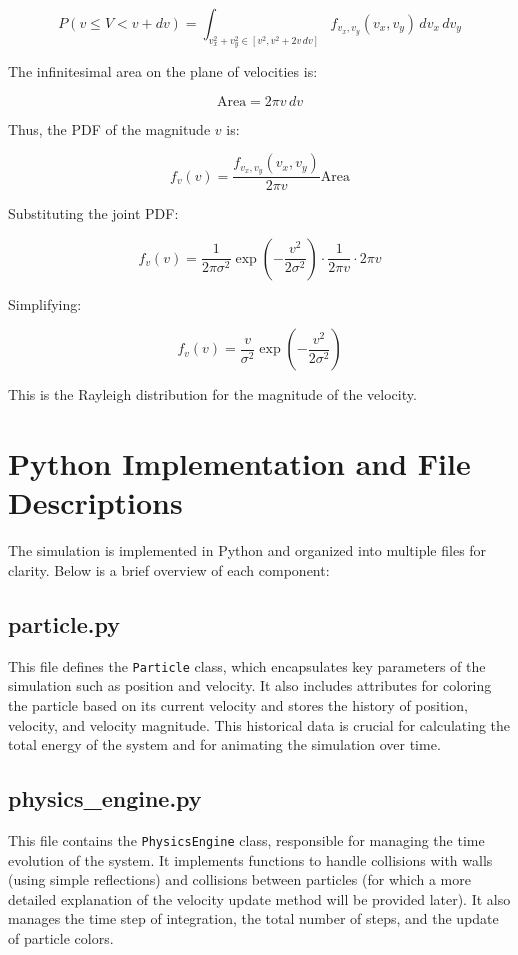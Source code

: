 \documentclass{article}
\begin{document}
\[
P(v \leq V < v + dv) = \int_{v_x^2 + v_y^2 \in [v^2, v^2 + 2v \, dv]} f_{v_x, v_y}(v_x, v_y) \, dv_x \, dv_y
\]

The infinitesimal area on the plane of velocities is:

\[
\text{Area} = 2 \pi v \, dv
\]

Thus, the PDF of the magnitude \( v \) is:

\[
f_v(v) = \frac{f_{v_x, v_y}(v_x, v_y)}{2 \pi v} \text{Area}
\]

Substituting the joint PDF:

\[
f_v(v) = \frac{1}{2 \pi \sigma^2} \exp \left( -\frac{v^2}{2 \sigma^2} \right) \cdot \frac{1}{2 \pi v} \cdot 2 \pi v
\]

Simplifying:

\[
f_v(v) = \frac{v}{\sigma^2} \exp \left( -\frac{v^2}{2 \sigma^2} \right)
\]

This is the Rayleigh distribution for the magnitude of the velocity.

\section{Python Implementation and File Descriptions}
The simulation is implemented in Python and organized into multiple files for clarity. Below is a brief overview of each component:
\subsection{particle.py}
This file defines the \texttt{Particle} class, which encapsulates key parameters of the simulation such as position and velocity. It also includes attributes for coloring the particle based on its current velocity and stores the history of position, velocity, and velocity magnitude. This historical data is crucial for calculating the total energy of the system and for animating the simulation over time.

\subsection{physics\_engine.py}
This file contains the \texttt{PhysicsEngine} class, responsible for managing the time evolution of the system. It implements functions to handle collisions with walls (using simple reflections) and collisions between particles (for which a more detailed explanation of the velocity update method will be provided later). It also manages the time step of integration, the total number of steps, and the update of particle colors.
\end{document}
